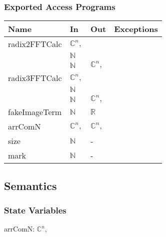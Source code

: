 \documentclass[12pt, titlepage]{article}
\begin{document}
\subsubsection{Exported Access Programs}

\begin{center}
\begin{tabular}{p{3cm} p{4cm} p{4cm} p{2cm}}
\hline
\textbf{Name} & \textbf{In} & \textbf{Out} & \textbf{Exceptions} \\
\hline
radix2FFTCalc&$\mathbb{C}^ n,$\\&$\mathbb{N}$\\&$\mathbb{N}$& $\mathbb{C}^ n,$& \\
radix3FFTCalc&$\mathbb{C}^ n,$\\&$\mathbb{N}$\\&$\mathbb{N}$&$\mathbb{C}^ n,$& \\
fakeImageTerm&$\mathbb{N}$ &$\mathbb{R}$& \\
arrComN&$\mathbb{C}^ n,$&$\mathbb{C}^ n,$&\\
size&$\mathbb{N}$& -&\\
mark&$\mathbb{N}$& -&\\

\hline
\end{tabular}
\end{center}

\subsection{Semantics}

\subsubsection{State Variables}
arrComN: $\mathbb{C}^ n,$
\end{document}
